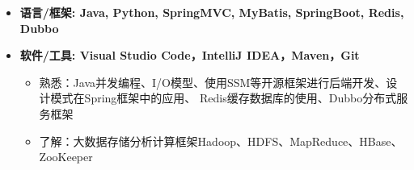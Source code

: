   \begin{itemize}[leftmargin=*]
    \item \textbf{语言/框架: Java, Python, SpringMVC, MyBatis, SpringBoot, Redis, Dubbo} %
    \item \textbf{软件/工具: Visual Studio Code，IntelliJ IDEA，Maven，Git}
    {\small
      \begin{itemize}
        \item{熟悉：Java并发编程、I/O模型、使用SSM等开源框架进行后端开发、设计模式在Spring框架中的应用、
        Redis缓存数据库的使用、Dubbo分布式服务框架}
        \item{了解：大数据存储分析计算框架Hadoop、HDFS、MapReduce、HBase、ZooKeeper}
      \end{itemize}
      }
  \end{itemize}